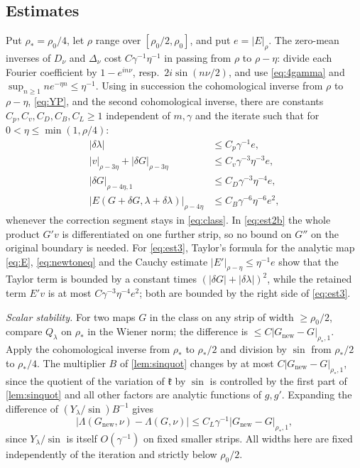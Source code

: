 \documentclass[11pt]{amsart}
\numberwithin{equation}{section}
\theoremstyle{definition}
\theoremstyle{remark}
\newcommand{\abs}[1]{\lvert #1\rvert}
\begin{document}
\subsection{Estimates}
Put $\rho_*=\rho_0/4$, let $\rho$ range over $[\rho_0/2,\rho_0]$, and put $e=\abs E_\rho$. The zero-mean inverses of $D_\nu$ and $\Delta_\nu$ cost $C\gamma^{-1}\eta^{-1}$ in passing from $\rho$ to $\rho-\eta$: divide each Fourier coefficient by $1-e^{in\nu}$, resp.\ $2i\sin(n\nu/2)$, and use \eqref{eq:4gamma} and $\sup_{n\ge1}ne^{-\eta n}\le\eta^{-1}$. Using in succession the cohomological inverse from $\rho$ to $\rho-\eta$, \eqref{eq:YP}, and the second cohomological inverse, there are constants $C_p,C_v,C_D,C_B,C_L\ge1$ independent of $m,\gamma$ and the iterate such that for $0<\eta\le\min(1,\rho/4)$:
\begin{align}
\abs{\delta\lambda}&\le C_p\gamma^{-1}e,\label{eq:est1}\\
\abs v_{\rho-3\eta}+\abs{\delta G}_{\rho-3\eta}&\le C_v\gamma^{-3}\eta^{-3}e,\label{eq:est2}\\
\abs{\delta G}_{\rho-4\eta,1}&\le C_D\gamma^{-3}\eta^{-4}e,\label{eq:est2b}\\
\abs{E(G+\delta G,\lambda+\delta\lambda)}_{\rho-4\eta}&\le C_B\gamma^{-6}\eta^{-6}e^2,\label{eq:est3}
\end{align}
whenever the correction segment stays in \eqref{eq:class}. In \eqref{eq:est2b} the whole product $G'v$ is differentiated on one further strip, so no bound on $G''$ on the original boundary is needed. For \eqref{eq:est3}, Taylor's formula for the analytic map \eqref{eq:E}, \eqref{eq:newtoneq} and the Cauchy estimate $\abs{E'}_{\rho-\eta}\le\eta^{-1}e$ show that the Taylor term is bounded by a constant times $(\abs{\delta G}+\abs{\delta\lambda})^2$, while the retained term $E'v$ is at most $C\gamma^{-3}\eta^{-4}e^2$; both are bounded by the right side of \eqref{eq:est3}.

\emph{Scalar stability.} For two maps $G$ in the class on any strip of width $\ge\rho_0/2$, compare $Q_\lambda$ on $\rho_*$ in the Wiener norm; the difference is $\le C\abs{G_{\mathrm{new}}-G}_{\rho_*,1}$. Apply the cohomological inverse from $\rho_*$ to $\rho_*/2$ and division by $\sin$ from $\rho_*/2$ to $\rho_*/4$. The multiplier $B$ of \cref{lem:sinquot} changes by at most $C\abs{G_{\mathrm{new}}-G}_{\rho_*,1}$, since the quotient of the variation of $\mathfrak k$ by $\sin$ is controlled by the first part of \cref{lem:sinquot} and all other factors are analytic functions of $g,g'$. Expanding the difference of $(Y_\lambda/\sin)B^{-1}$ gives
\begin{equation}\label{eq:est4}
\abs{\Lambda(G_{\mathrm{new}},\nu)-\Lambda(G,\nu)}\le C_L\gamma^{-1}\abs{G_{\mathrm{new}}-G}_{\rho_*,1},
\end{equation}
since $Y_\lambda/\sin$ is itself $O(\gamma^{-1})$ on fixed smaller strips. All widths here are fixed independently of the iteration and strictly below $\rho_0/2$.
\end{document}
